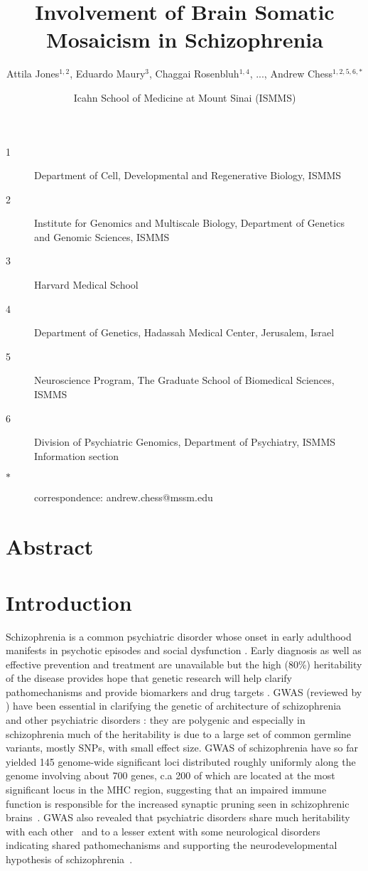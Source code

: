 \documentclass[letterpaper]{article}
\title{Involvement of Brain Somatic Mosaicism in Schizophrenia}
\author{Attila Jones\(^{1,2}\), Eduardo Maury\(^{3}\), Chaggai Rosenbluh\(^{1,4}\), ..., Andrew Chess\(^{1,2,5,6,\ast}\)}
\date{Icahn School of Medicine at Mount Sinai (ISMMS)}
\begin{document}
\maketitle

\begin{description}
\item[1] Department of Cell, Developmental and Regenerative Biology, ISMMS 
\item[2] Institute for Genomics and Multiscale Biology, Department of Genetics and Genomic Sciences, ISMMS 
\item[3] Harvard Medical School
\item[4] Department of Genetics, Hadassah Medical Center, Jerusalem, Israel
\item[5] Neuroscience Program, The Graduate School of Biomedical Sciences, ISMMS 
\item[6] Division of Psychiatric Genomics, Department of Psychiatry, ISMMS 
Information section
\item[\(\ast\)] correspondence: andrew.chess@mssm.edu 
\end{description}

\clearpage

\section*{Abstract}

\section*{Introduction}

Schizophrenia is a common psychiatric disorder whose onset in early adulthood
manifests in psychotic episodes and social dysfunction \citep{Kahn2015}.
Early diagnosis as well as effective prevention and treatment are unavailable
but the high (80\%) heritability of the disease provides hope that genetic
research will help clarify pathomechanisms and provide biomarkers and drug
targets \citep{Breen2016,Foley2017}.  GWAS (reviewed by \cite{Visscher2017})
have been essential in clarifying the genetic of architecture of
schizophrenia~\citep{Ripke2014,Pardinas2018} and other psychiatric disorders
\citep{Sullivan2012}: they are polygenic and especially in schizophrenia much
of the heritability is due to a large set of common germline variants, mostly
SNPs, with small effect size.  GWAS of schizophrenia have so far yielded 145
genome-wide significant loci distributed roughly uniformly along the genome
involving about 700 genes, c.a 200 of which are located at the most
significant locus in the MHC region, suggesting that an impaired immune
function is responsible for the increased synaptic pruning seen in
schizophrenic brains~\citep{Sekar2016a}.  GWAS
also revealed that psychiatric disorders share much heritability with each
other~\citep{Consortium2009,PsychiatricGenomicsConsortium2013} and to a lesser
extent with some neurological disorders~\citep{Consortium2018} indicating
shared pathomechanisms and supporting the neurodevelopmental hypothesis of
schizophrenia~\citep{Nour2015}.
\end{document}
